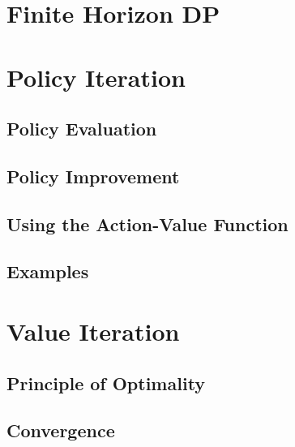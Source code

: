     \section{Finite Horizon DP} %

    \section{Policy Iteration} %

        \subsection{Policy Evaluation} %

        \subsection{Policy Improvement} %

        \subsection{Using the Action-Value Function} %

        \subsection{Examples} %

    \section{Value Iteration} %

        \subsection{Principle of Optimality} %

        \subsection{Convergence} %

